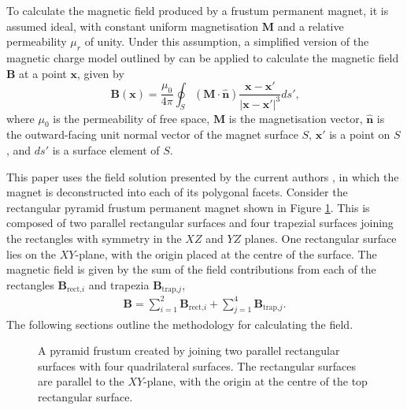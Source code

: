 To calculate the magnetic field produced by a frustum permanent magnet, it is assumed ideal, with constant uniform magnetisation \(\mathbf{M}\) and a relative permeability \(\mu_r\) of unity. Under this assumption, a simplified version of the magnetic charge model outlined by \textcite{Furlani2001} can be applied to calculate the magnetic field \(\mathbf{B}\) at a point \(\mathbf{x}\), given by
\begin{equation}
\mathbf{B}\left(\mathbf{x}\right) = \frac{\mu_0}{4\pi} \oint_S \left( \mathbf{M} \cdot \hat{\mathbf{n}} \right) \frac{\mathbf{x} - \mathbf{x}'}{\left| \mathbf{x} - \mathbf{x}' \right| ^3} ds' \text{,}
\label{eqn:p3chargeModel}
\end{equation}
where \(\mu_0\) is the permeability of free space, \(\mathbf{M}\) is the magnetisation vector, \(\hat{\mathbf{n}}\) is the outward-facing unit normal vector of the magnet surface \(S\), \(\mathbf{x}'\) is a point on \(S\), and \(ds'\) is a surface element of \(S\).

This paper uses the field solution presented by the current authors \cite{OConnell2020a}, in which the magnet is deconstructed into each of its polygonal facets. Consider the rectangular pyramid frustum permanent magnet shown in Figure \ref{fig:p3myFrustum}. This is composed of two parallel rectangular surfaces and four trapezial surfaces joining the rectangles with symmetry in the \(XZ\) and \(YZ\) planes. One rectangular surface lies on the \(XY\)-plane, with the origin placed at the centre of the surface. The magnetic field is given by the sum of the field contributions from each of the rectangles \(\mathbf{B}_{\text{rect,}i}\) and trapezia \(\mathbf{B}_{\text{trap,}j}\),
\begin{align}
\mathbf{B} = \sum_{i=1}^2 \mathbf{B}_{\text{rect,}i} + \sum_{j=1}^4 \mathbf{B}_{\text{trap,}j} \text{.}
\end{align}
The following sections outline the methodology for calculating the field.
\begin{figure}
	\centering
	
	\caption{A pyramid frustum created by joining two parallel rectangular surfaces with four quadrilateral surfaces. The rectangular surfaces are parallel to the \(XY\)-plane, with the origin at the centre of the top rectangular surface.}
	\label{fig:p3myFrustum}
\end{figure}

